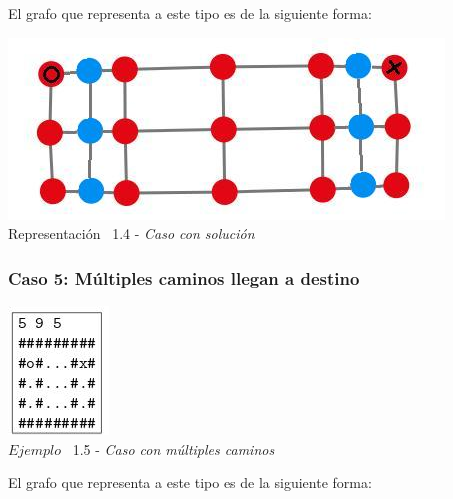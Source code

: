El grafo que representa a este tipo es de la siguiente forma:\\

\vspace*{0.3cm} \vspace*{0.3cm}
  \begin{center}
 \includegraphics[scale=0.5]{./EJ1/ej1graforandom.jpeg}
 \\{Representaci\'on \ 1.4 - \textit{Caso con solución}}
  \end{center}
  \vspace*{0.3cm}

\begin{center}
  \subsubsection*{Caso 5: M\'ultiples caminos llegan a destino}
\end{center}

\vspace*{0.3cm} \vspace*{0.3cm}
  \begin{center}
 \includegraphics[scale=1.6]{./EJ1/ej1random.jpeg}
\\ {$Ejemplo$ \ 1.5 - \textit{Caso con m\'ultiples caminos}}
  \end{center}
  \vspace*{0.3cm}

El grafo que representa a este tipo es de la siguiente forma:\\

